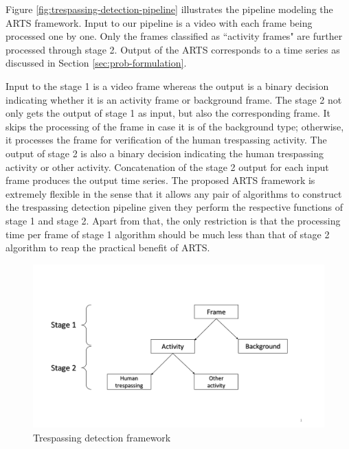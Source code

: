 Figure \ref{fig:trespassing-detection-pipeline} illustrates the pipeline modeling the ARTS framework.
Input to our pipeline is a video with each frame being processed one by one. Only the frames classified as  ``activity frames" are further processed through stage 2. Output of the ARTS corresponds to a time series as discussed in Section \ref{sec:prob-formulation}. 

Input to the stage 1 is a video frame whereas the output is a binary decision indicating whether it is an activity frame or background frame. The stage 2 not only gets the output of stage 1 as input, but also the corresponding frame. It skips the processing of the frame in case it is of the background type; otherwise, it processes the frame for verification of the human trespassing activity. The output of stage 2 is also a binary decision indicating the human trespassing activity or other activity. Concatenation of the stage 2 output for each input frame produces the output time series. The proposed ARTS framework is extremely flexible in the sense that it allows any pair of algorithms to construct the trespassing detection pipeline given they perform the respective functions of stage 1 and stage 2. Apart from that, the only restriction is that the processing time per frame of stage 1 algorithm should be much less than that of stage 2 algorithm to reap the practical benefit of ARTS. 

\begin{figure}
    \centering
    \includegraphics[width=\linewidth,trim={50 110 50 130},clip]{images/trespassing-detection-framework}
    \caption{Trespassing detection framework}
    \label{fig:trespassing-detection-framework}
\end{figure}


